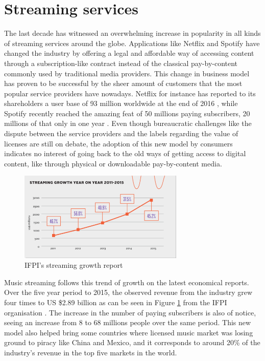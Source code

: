 \documentclass{kththesis}
\begin{document}
	
	\section{Streaming services}

	The last decade has witnessed an overwhelming increase in popularity in all kinds of streaming services around the globe. Applications like Netflix and Spotify have changed the industry by offering a legal and affordable way of accessing content through a subscription-like contract instead of the classical pay-by-content commonly used by traditional media providers. This change in business model has proven to be successful by the sheer amount of customers that the most popular service providers have nowadays. Netflix for instance has reported to its shareholders a user base of 93 million worldwide at the end of 2016 \citep{netflixsh}, while Spotify recently reached the amazing feat of 50 millions paying subscribers, 20 millions of that only in one year \citep{spotifypress}. Even though bureaucratic challenges like the dispute between the service providers and the labels regarding the value of licenses are still on debate, the adoption of this new model by consumers indicates no interest of going back to the old ways of getting access to digital content, like through physical or downloadable pay-by-content media.

	\begin{figure}[h]
    \centering
    \includegraphics[width=0.7\textwidth, natwidth=580bp, natheight=313bp]{figures/ifpi_stream_growth.png}
    \caption{IFPI's streaming growth report}
    \label{fig:ifpi-growth-report}
\end{figure}

	Music streaming follows this trend of growth on the latest economical reports. Over the five year period to 2015, the observed revenue from the industry grew four times to US \$2.89 billion as can be seen in Figure \ref{fig:ifpi-growth-report} from the IFPI organisation \citep{ifpi}. The increase in the number of paying subscribers is also of notice, seeing an increase from 8 to 68 millions people over the same period. This new model also helped bring some countries where licensed music market was losing ground to piracy like China and Mexico, and it corresponds to around 20\% of the industry's revenue in the top five markets in the world. 
	
\end{document}
